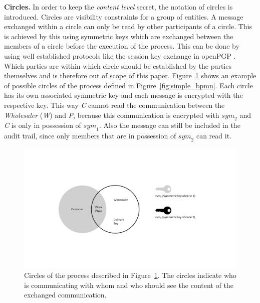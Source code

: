 \documentclass[runningheads]{llncs}
\newcommand{\ber}[1]{\textit{#1}}
\newcommand{\reffig}[1]{Figure~\ref{#1}}
\newcommand{\creditfootnote}[1]{}
\begin{document}
\textbf{Circles.} In order to keep the \textit{content level} secret, the notation of circles is introduced. Circles are visibility constraints for a group of entities. A message exchanged within a circle can only be read by other participants of a circle. This is achieved by this using symmetric keys which are exchanged between the members of a circle before the execution of the process. This can be done by using well established protocols like the session key exchange in openPGP \cite{openpgp}. Which parties are within which circle should be established by the parties themselves and is therefore out of scope of this paper. \reffig{fig:circles} shows an example of possible circles of the process defined in  \reffig{fig:simple_bpmn}. Each circle has its own associated symmetric key and each message is encrypted with the respective key. This way \ber{C} cannot read the communication between the \ber{Wholesaler} (\ber{W}) and \ber{P}, because this communication is encrypted with ${sym}_2$ and \ber{C} is only in possession of ${sym}_1$. Also the message can still be included in the audit trail, since only members that are in possession of ${sym}_2$ can read it.\creditfootnote{Credit: key-icons in \reffig{fig:circles} made by Yannick (http://yanlu.de) from www.flaticon.com}


\begin{center}
\begin{figure}
    \centering
    \includegraphics[trim=0cm 0cm 0cm 0cm,clip=true,scale=0.25]{circles.png}
    \caption{Circles of the process described in \reffig{fig:circles}. The circles indicate who is communicating with whom and who should see the content of the exchanged communication.} 
    \label{fig:circles}
\end{figure}
\end{center}
\end{document}
